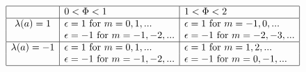 \begin{equation}
\begin{array}{|c|l|l|}\hline
&0<\Phi<1&1<\Phi<2\\\hline
\lambda(a)=1&\epsilon=1\text{ for }m=0,1,... &\epsilon=1\text{ for }m=-1,0,... \\
&\epsilon=-1\text{ for }m=-1,-2,... &\epsilon=-1\text{ for }m=-2,-3,... \\\hline
\lambda(a)=-1&\epsilon=1\text{ for }m=0,1,... &\epsilon=1\text{ for }m=1,2,...\\
&\epsilon=-1\text{ for }m=-1,-2,... &\epsilon=-1\text{ for }
m=0,-1,...\\\hline 
\end{array} \label{tabel}
\end{equation}

